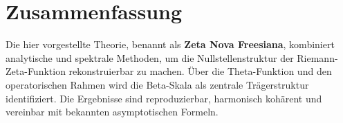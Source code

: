 \documentclass[12pt]{article}
\begin{document}
\section{Zusammenfassung}
Die hier vorgestellte Theorie, benannt als \textbf{Zeta Nova Freesiana}, kombiniert analytische und spektrale Methoden, um die Nullstellenstruktur der Riemann-Zeta-Funktion rekonstruierbar zu machen. Über die Theta-Funktion und den operatorischen Rahmen wird die Beta-Skala als zentrale Trägerstruktur identifiziert. Die Ergebnisse sind reproduzierbar, harmonisch kohärent und vereinbar mit bekannten asymptotischen Formeln.
\end{document}
